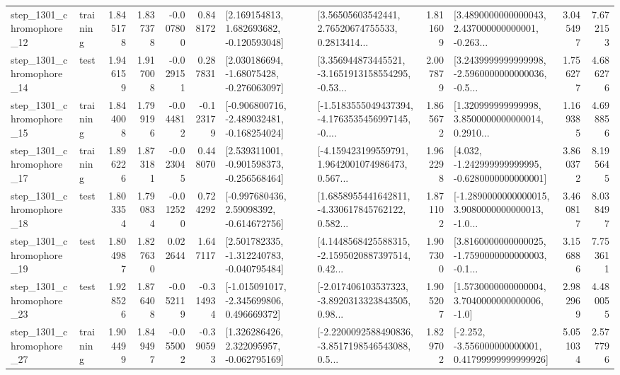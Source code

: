 \begin{tabular}{llrrrrllrlrr}
 step\_1301\_chromophore\_12 &  training &      1.845178 &    1.837378 &     -0.007800 &  0.848172 &    [2.169154813, 1.682693682, -0.120593048] &  [3.56505603542441, 2.76520674755533, 0.2813414... &       1.811609 &  [3.4890000000000043, 2.437000000000001, -0.263... &            3.045497 &          7.672153 \\
 step\_1301\_chromophore\_14 &      test &      1.946159 &    1.917008 &     -0.029151 &  0.287831 &    [2.030186694, -1.68075428, -0.276063097] &  [3.356944873445521, -3.1651913158554295, -0.53... &       2.007879 &  [3.2439999999999998, -2.5960000000000036, -0.5... &            1.756277 &          4.686276 \\
 step\_1301\_chromophore\_15 &  training &      1.844008 &    1.799196 &     -0.044812 & -0.123179 &  [-0.906800716, -2.489032481, -0.168254024] &  [-1.5183555049437394, -4.1763535456997145, -0.... &       1.865672 &  [1.320999999999998, 3.8500000000000014, 0.2910... &            1.169385 &          4.698856 \\
 step\_1301\_chromophore\_17 &  training &      1.896226 &    1.873181 &     -0.023045 &  0.448070 &   [2.539311001, -0.901598373, -0.256568464] &  [-4.159423199559791, 1.9642001074986473, 0.567... &       1.962298 &   [4.032, -1.242999999999995, -0.6280000000000001] &            3.860372 &          8.195645 \\
 step\_1301\_chromophore\_18 &      test &      1.803354 &    1.790834 &     -0.012520 &  0.724292 &    [-0.997680436, 2.59098392, -0.614672756] &  [1.6858955441642811, -4.330617845762122, 0.582... &       1.871102 &  [-1.2890000000000015, 3.9080000000000013, -1.0... &            3.460817 &          8.038497 \\
 step\_1301\_chromophore\_19 &      test &      1.804987 &    1.827630 &      0.022644 &  1.647117 &   [2.501782335, -1.312240783, -0.040795484] &  [4.1448568425588315, -2.1595020887397514, 0.42... &       1.907300 &  [3.8160000000000025, -1.7590000000000003, -0.1... &            3.156886 &          7.753611 \\
 step\_1301\_chromophore\_23 &      test &      1.928526 &    1.876408 &     -0.052119 & -0.314934 &   [-1.015091017, -2.345699806, 0.496669372] &  [-2.017406103537323, -3.8920313323843505, 0.98... &       1.905207 &     [1.5730000000000004, 3.7040000000000006, -1.0] &            2.982969 &          4.480055 \\
 step\_1301\_chromophore\_27 &  training &      1.904499 &    1.849497 &     -0.055002 & -0.390593 &    [1.326286426, 2.322095957, -0.062795169] &  [-2.2200092588490836, -3.8517198546543088, 0.5... &       1.829702 &  [-2.252, -3.556000000000001, 0.41799999999999926] &            5.051034 &          2.577796 \\

\end{tabular}

